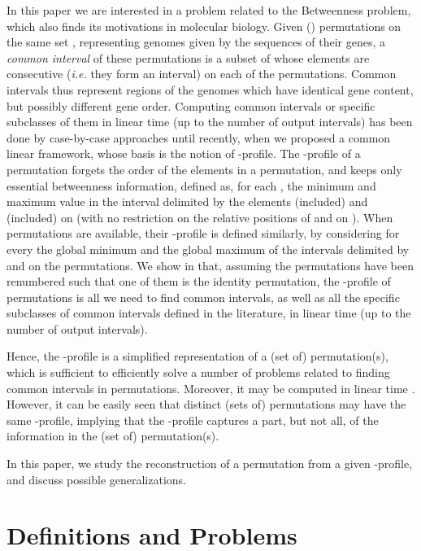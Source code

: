 \documentclass{article}
\begin{document}
In this paper we are interested in a problem related to the {\sc Betweenness} problem,  which also
finds its motivations in molecular biology. Given  () permutations on the
same set , representing  genomes given by the sequences of their genes, a {\em common interval} 
of these permutations is a subset of  whose elements are consecutive ({\em i.e.} they form an interval) 
on each of the  permutations. Common intervals thus represent regions of the genomes which have identical 
gene content, but possibly different gene order. Computing common intervals or specific subclasses of
them in linear time (up to the number of output intervals) has been done by case-by-case approaches
until recently, when we  proposed \cite{IR} a common linear framework, whose basis is the notion of
-profile. The -profile of a permutation  forgets the order of the elements in a permutation, 
and keeps only essential betweenness information, defined as, for each , the minimum
and maximum value in the interval delimited by the elements  (included) and  (included) 
on  (with no restriction on the relative positions of  and  on ). When  permutations 
are available, their -profile is defined similarly, by considering for every   the global 
minimum and the global maximum of the  intervals delimited by  and  on the  permutations. 
We show in \cite{IR} that, assuming the permutations have been renumbered such that one of them is
the identity permutation, the -profile of  permutations is all we need to find common intervals,
as well as all the specific subclasses of common intervals defined in the literature, in linear time (up to the number of output intervals).

Hence, the -profile is a simplified representation of a (set of) permutation(s), which is sufficient
to efficiently solve a number of problems related to finding common intervals in permutations. 
Moreover, it may be computed in linear time \cite{IR}. However, it can be easily seen that distinct
(sets of) permutations may have the same -profile, implying that the -profile captures a part,
but not all, of the information in the (set of) permutation(s). 

In this paper, we study the reconstruction of a permutation from a given -profile, and discuss possible
generalizations.  


\section{Definitions and Problems}\label{sect:def}
\end{document}

